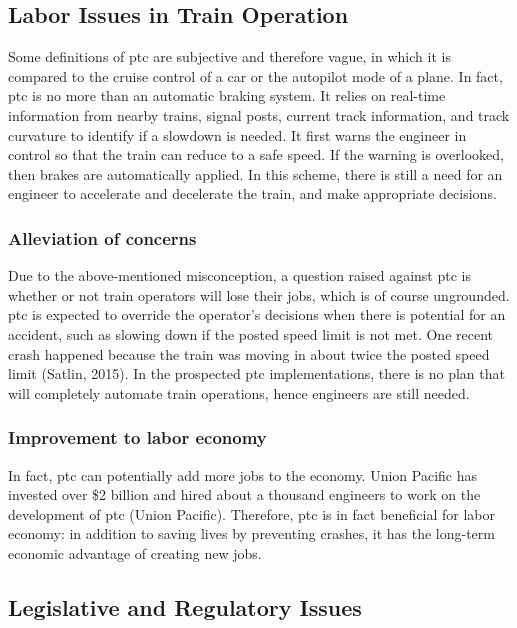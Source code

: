 \documentclass[11pt, titlepage]{article}
\begin{document}
\subsection{Labor Issues in Train Operation}

Some definitions of \gls{ptc} are subjective and therefore vague, in which it is
compared to the cruise control of a car or the autopilot mode of a plane. In fact,
\gls{ptc} is no more than an automatic braking system. It relies on real-time
information from nearby trains, signal posts, current track information, and track
curvature to identify if a slowdown is needed. It first warns the engineer in
control so that the train can reduce to a safe speed. If the warning is overlooked,
then brakes are automatically applied. In this scheme, there is still a need for an
engineer to accelerate and decelerate the train, and make appropriate decisions.

\subsubsection{Alleviation of concerns}

Due to the above-mentioned misconception, a question raised against \gls{ptc} is
whether or not train operators will lose their jobs, which is of course ungrounded.
\gls{ptc} is expected to override the operator’s decisions when there is potential
for an accident, such as slowing down if the posted speed limit is not met. One
recent crash happened because the train was moving in about twice the posted speed
limit (Satlin, 2015). In the prospected \gls{ptc} implementations, there is no plan
that will completely automate train operations, hence engineers are still needed.

\subsubsection{Improvement to labor economy}

In fact, \gls{ptc} can potentially add more jobs to the economy. Union Pacific has
invested over \$2 billion and hired about a thousand engineers to work on the
development of \gls{ptc} (Union Pacific). Therefore, \gls{ptc} is in fact beneficial
for labor economy: in addition to saving lives by preventing crashes, it has the
long-term economic advantage of creating new jobs.

\subsection{Legislative and Regulatory Issues}
\end{document}
